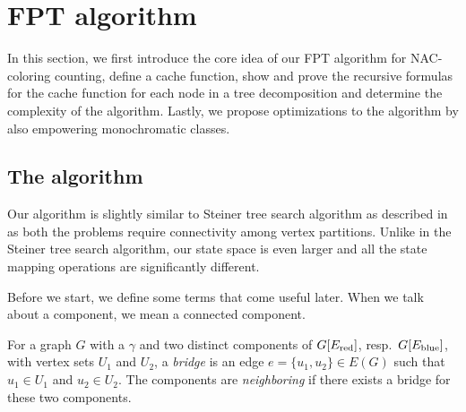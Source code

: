 \section{FPT algorithm}

In this section, we first introduce the core idea of
our FPT algorithm for NAC-coloring counting,
define a cache function,
show and prove the recursive formulas for the cache function for each node in a tree decomposition
and determine the complexity of the algorithm.
Lastly, we propose optimizations to the algorithm by also empowering monochromatic classes.


\subsection{The algorithm}

Our algorithm is slightly similar to Steiner tree search algorithm
as described in~\cite{book_parametrized_algorithms} as both the problems require connectivity
among vertex partitions. Unlike in the Steiner tree search algorithm,
our state space is even larger and all the state mapping operations are significantly different.

Before we start, we define some terms that come useful later.
When we talk about a component, we mean a connected component.
%
\begin{definition}
	For a graph \( G \) with a \rbcol{} \( \gamma \)
	and two distinct components of \( G[E_\text{red}] \), resp.\ \( G[E_\text{blue}] \),
	with vertex sets \( U_1 \) and \( U_2 \),
	a \emph{bridge} is an edge \( e = \{u_1, u_2\} \in E(G) \)
	such that \( u_1 \in U_1 \) and \( u_2 \in U_2 \).
	The components are \emph{neighboring} if there exists
	a bridge for these two components.
\end{definition}
%

